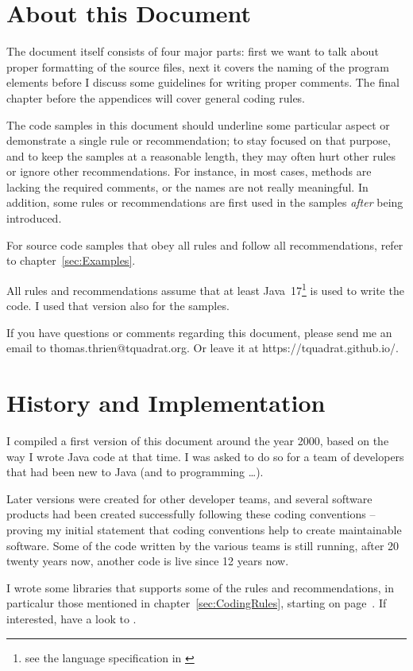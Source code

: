 \documentclass[12pt,a4paper,titlepage, parskip=half, headsepline, footsepline, cleardoubleplain]{scrbook}
\begin{document}
\section{About this Document}
The document itself consists of four major parts: first we want to talk about proper formatting of the source files, next it covers the naming of the program elements before I discuss some guidelines for writing proper comments. The final chapter before the appendices will cover general coding rules.

The code samples in this document should underline some particular aspect or demonstrate a single rule or recommendation; to stay focused on that purpose, and to keep the samples at a reasonable length, they may often hurt other rules or ignore other recommendations. For instance, in most cases, methods are lacking the required comments, or the names are not really meaningful. In addition, some rules or recommendations are first used in the samples \textit{after} being introduced.

For source code samples that obey all rules and follow all recommendations, refer to chapter~\vref{sec:Examples}.

All rules and recommendations assume that at least Java~17\footnote{see the language specification in \autocite{ORACLE_DOC_LANGUAGE_SPECIFICATION}} is used to write the code. I used that version also for the samples.

If you have questions or comments regarding this document, please send me an email to thomas.thrien@tquadrat.org. Or leave it at https://tquadrat.github.io/.

\section{History and Implementation}
I compiled a first version of this document around the year 2000, based on the way I wrote Java code at that time. I was asked to do so for a team of developers that had been new to Java (and to programming …).

Later versions were created for other developer teams, and several software products had been created successfully following these coding conventions – proving my initial statement that coding conventions help to create maintainable software. Some of the code written by the various teams is still running, after 20 twenty years now, another code is live since 12 years now.

I wrote some libraries that supports some of the rules and recommendations, in particalur those mentioned in chapter~\ref{sec:CodingRules}, starting on page~\pageref{sec:CodingRules}. If interested, have a look to \autocite{TQUADRAT_ORG}.
\end{document}
